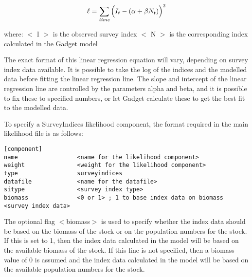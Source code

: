 \documentclass[10pt,twoside]{book}
\begin{document}
\begin{equation}\label{eq:surveyindex}
\ell = \sum_{\it time}\Big(I_{t} - (\alpha + \beta N_{t})\Big)^2
\end{equation}

where:\newline
$<$ I $>$ is the observed survey index\newline
$<$ N $>$ is the corresponding index calculated in the Gadget model



\bigskip
The exact format of this linear regression equation will vary, depending on survey index data available.  It is possible to take the log of the indices and the modelled data before fitting the linear regression line.  The slope and intercept of the linear regression line are controlled by the parameters alpha and beta, and it is possible to fix these to specified numbers, or let Gadget calculate these to get the best fit to the modelled data.

\bigskip
To specify a SurveyIndices likelihood component, the format required in the main likelihood file is as follows:

{\small\begin{verbatim}
[component]
name                 <name for the likelihood component>
weight               <weight for the likelihood component>
type                 surveyindices
datafile             <name for the datafile>
sitype               <survey index type>
biomass              <0 or 1> ; 1 to base index data on biomass
<survey index data>
\end{verbatim}}

The optional flag $<$biomass$>$ is used to specify whether the index data should be based on the biomass of the stock or on the population numbers for the stock.  If this is set to 1, then the index data calculated in the model will be based on the available biomass of the stock.  If this line is not specified, then a biomass value of 0 is assumed and the index data calculated in the model will be based on the available population numbers for the stock.
\end{document}
